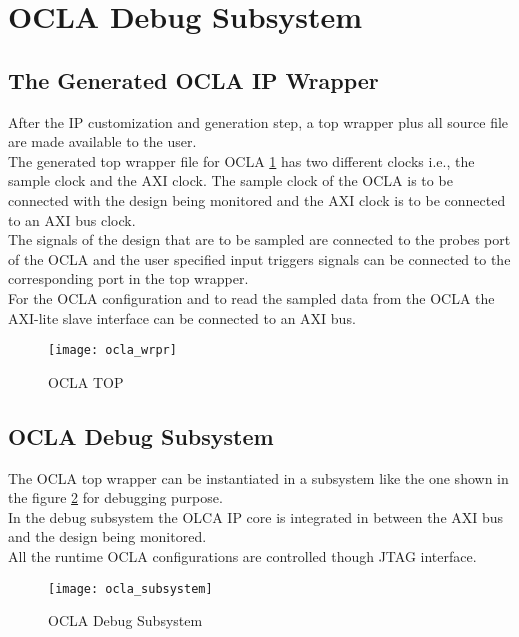 \newpage

\section*{ \hfill OCLA Debug Subsystem}



\subsection*{\fontsize{14}{16}\selectfont The Generated OCLA IP Wrapper}

After the IP customization and generation step, a top wrapper plus all source file are made available to the user.\\ 
The generated top wrapper file for OCLA \ref{fig:ocla_wrpr} has two different clocks i.e., the sample clock and the AXI clock. The sample clock of the OCLA is to be connected with
the design being monitored and the AXI clock is to be connected to an AXI bus clock.\\ The signals of the design that are to be sampled are connected to the probes port of the OCLA and the user specified input triggers signals can be connected to the corresponding 
port in the top wrapper. \\For the OCLA configuration and to read the sampled data from the OCLA the AXI-lite slave interface can be connected to an AXI bus.      

\begin{figure}[h]\centering %
	\texttt{[image: ocla\_wrpr]}
	\caption{\fontsize{8}{9}\selectfont OCLA TOP}
	\label{fig:ocla_wrpr}
\end{figure}

\subsection*{\fontsize{14}{16}\selectfont OCLA Debug Subsystem}
The OCLA top wrapper can be instantiated in a subsystem like the one shown in the figure \ref{fig:ocla_subsystem} for debugging purpose. \\In the debug
subsystem the OLCA IP core is integrated in between the AXI bus and the design being monitored.\\All the runtime OCLA configurations are controlled though JTAG interface.    


\begin{figure}[h]\centering %
	\texttt{[image: ocla\_subsystem]}
	\caption{\fontsize{8}{9}\selectfont OCLA Debug Subsystem}
	\label{fig:ocla_subsystem}
\end{figure}


